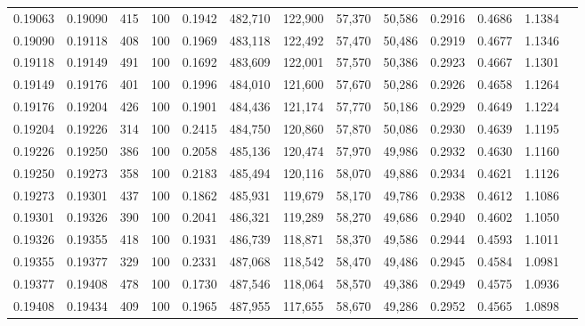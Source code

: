 \begin{tabular}{rrrrrrrrrrrrr}
0.19063 & 0.19090 &   415 & 100 &                                     0.1942 & 482,710 & 122,900 &  57,370 &  50,586 & 0.2916 & 0.4686 & 1.1384 \\
0.19090 & 0.19118 &   408 & 100 &                                     0.1969 & 483,118 & 122,492 &  57,470 &  50,486 & 0.2919 & 0.4677 & 1.1346 \\
0.19118 & 0.19149 &   491 & 100 &                                     0.1692 & 483,609 & 122,001 &  57,570 &  50,386 & 0.2923 & 0.4667 & 1.1301 \\
0.19149 & 0.19176 &   401 & 100 &                                     0.1996 & 484,010 & 121,600 &  57,670 &  50,286 & 0.2926 & 0.4658 & 1.1264 \\
0.19176 & 0.19204 &   426 & 100 &                                     0.1901 & 484,436 & 121,174 &  57,770 &  50,186 & 0.2929 & 0.4649 & 1.1224 \\
0.19204 & 0.19226 &   314 & 100 &                                     0.2415 & 484,750 & 120,860 &  57,870 &  50,086 & 0.2930 & 0.4639 & 1.1195 \\
0.19226 & 0.19250 &   386 & 100 &                                     0.2058 & 485,136 & 120,474 &  57,970 &  49,986 & 0.2932 & 0.4630 & 1.1160 \\
0.19250 & 0.19273 &   358 & 100 &                                     0.2183 & 485,494 & 120,116 &  58,070 &  49,886 & 0.2934 & 0.4621 & 1.1126 \\
0.19273 & 0.19301 &   437 & 100 &                                     0.1862 & 485,931 & 119,679 &  58,170 &  49,786 & 0.2938 & 0.4612 & 1.1086 \\
0.19301 & 0.19326 &   390 & 100 &                                     0.2041 & 486,321 & 119,289 &  58,270 &  49,686 & 0.2940 & 0.4602 & 1.1050 \\
0.19326 & 0.19355 &   418 & 100 &                                     0.1931 & 486,739 & 118,871 &  58,370 &  49,586 & 0.2944 & 0.4593 & 1.1011 \\
0.19355 & 0.19377 &   329 & 100 &                                     0.2331 & 487,068 & 118,542 &  58,470 &  49,486 & 0.2945 & 0.4584 & 1.0981 \\
0.19377 & 0.19408 &   478 & 100 &                                     0.1730 & 487,546 & 118,064 &  58,570 &  49,386 & 0.2949 & 0.4575 & 1.0936 \\
0.19408 & 0.19434 &   409 & 100 &                                     0.1965 & 487,955 & 117,655 &  58,670 &  49,286 & 0.2952 & 0.4565 & 1.0898 \\

\end{tabular}
